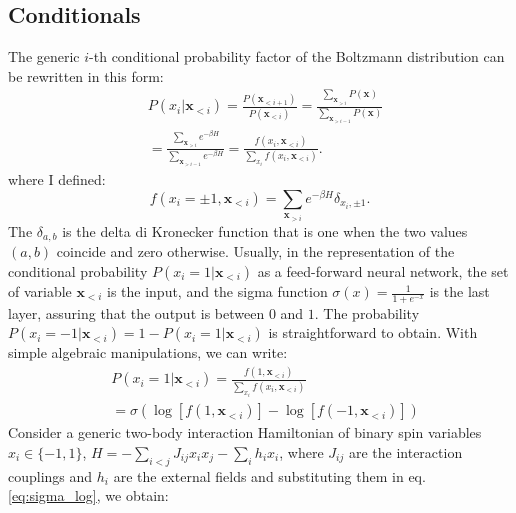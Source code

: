 \documentclass[aps,physrev,10pt,floatfix,reprint]{revtex4-2}
\begin{document}
\subsection{Conditionals}
The generic $i$-th conditional probability factor of the Boltzmann distribution can be rewritten in this form: 
\begin{equation}
    \label{eq:chain}
    \begin{split}
    & P\left(x_{i}|\mathbf{x}_{<i}\right)  = 
    \frac{P\left(\mathbf{x}_{<i+1}\right)}{P\left(\mathbf{x}_{<i}\right)}  = 
    \frac{\sum_{\mathbf{x}_{>i}}P\left(\mathbf{x}\right)}{\sum_{\mathbf{x}_{>i-1}}P\left(\mathbf{x}\right)} \\
    &=\frac{\sum_{\mathbf{x}_{>i}}e^{-\beta H}}{\sum_{\mathbf{x}_{>i-1}}e^{-\beta H}}  = 
    \frac{f\left(x_{i},\mathbf{x}_{<i}\right)}{\sum_{x_{i}}f\left(x_{i},\mathbf{x}_{<i}\right)}.
    \end{split}
\end{equation}
where I defined: 
\begin{equation}
f\left(x_{i}=\pm 1,\mathbf{x}_{<i}\right) = \sum_{\mathbf{x}_{>i}}e^{-\beta H}\delta_{x_i, \pm1}.  
\end{equation}
The $\delta_{a,b}$ is the delta di Kronecker function that is one when the two values $(a,b)$ coincide and zero otherwise. Usually, in the representation of the conditional probability $P\left(x_{i}=1|\mathbf{x}_{<i}\right)$ as a feed-forward neural network, the set of variable $\mathbf{x}_{<i}$ is the input, and the sigma function $\sigma(x)=\frac{1}{1+e^{-x}}$ is the last layer, assuring that the output is between $0$ and $1$. The probability $P\left(x_{i}=-1|\mathbf{x}_{<i}\right) = 1 - P\left(x_{i}=1|\mathbf{x}_{<i}\right)$ is straightforward to obtain. With simple algebraic manipulations, we can write: 
\begin{equation}
    \label{eq:sigma_log}
    \begin{split}
    & P\left(x_{i}=1|\mathbf{x}_{<i}\right) = \frac{f\left(1,\mathbf{x}_{<i}\right)}{\sum_{x_{i}}f\left(x_{i},\mathbf{x}_{<i}\right)}\\
    &= \sigma\left(\log\left[f\left(1,\mathbf{x}_{<i}\right)\right]-\log\left[f\left(-1,\mathbf{x}_{<i}\right)\right]\right)
    \end{split}
\end{equation}
Consider a generic two-body interaction Hamiltonian of binary spin variables $x_i \in \{-1,1\}$, $H = -\sum_{i<j} J_{ij} x_i x_j - \sum_{i} h_i x_i$, where $J_{ij}$ are the interaction couplings and $h_i$ are the external fields and substituting them in eq.\ref{eq:sigma_log}, we obtain:
\end{document}
